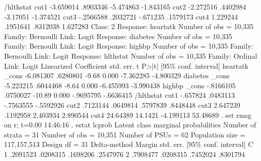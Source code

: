 /hlthstat    {\VBAR}
        cut1 {\VBAR}  -3.659014   .8903346                     -5.474863   -1.843165
        cut2 {\VBAR}  -2.272516   .4402984                      -3.17051   -1.374521
        cut3 {\VBAR}  -.2566588   .2032721                      -.671235    .1579173
        cut4 {\VBAR}   1.229244   .1951641                      .8312038    1.627283
{\smallskip}
Class:    2        
{\smallskip}
Response: heartatk                                      Number of obs = 10,335
Family:   Bernoulli
Link:     Logit    
{\smallskip}
Response: diabetes                                      Number of obs = 10,335
Family:   Bernoulli
Link:     Logit    
{\smallskip}
Response: highbp                                        Number of obs = 10,335
Family:   Bernoulli
Link:     Logit    
{\smallskip}
Response: hlthstat                                      Number of obs = 10,335
Family:   Ordinal  
Link:     Logit    
{\smallskip}
             {\VBAR}             Linearized
             {\VBAR} Coefficient  std. err.      t    P>|t|     [95\% conf. interval]
heartatk     {\VBAR}
       _cons {\VBAR}  -6.081307   .6280801    -9.68   0.000    -7.362285   -4.800329
diabetes     {\VBAR}
       _cons {\VBAR}  -5.223215   .6044468    -8.64   0.000    -6.455993   -3.990438
highbp       {\VBAR}
       _cons {\VBAR}  -.8166105   .0750027   -10.89   0.000    -.9695795   -.6636415
/hlthstat    {\VBAR}
        cut1 {\VBAR}   -.657824   .0483113                     -.7563555   -.5592926
        cut2 {\VBAR}   .7123144   .0649814                      .5797839    .8448448
        cut3 {\VBAR}   2.647239   .1192958                      2.403934    2.890544
        cut4 {\VBAR}   24.64389    14.1421                     -4.199113    53.48689
{\smallskip}
. set rmsg on     
r; t=0.00 14:46:16
{\smallskip}
. estat lcprob
{\smallskip}
Latent class marginal probabilities
{\smallskip}
Number of strata = 31                            Number of obs   =      10,351
Number of PSUs   = 62                            Population size = 117,157,513
                                                 Design df       =          31
{\smallskip}
             {\VBAR}            Delta-method
             {\VBAR}     Margin   std. err.     [95\% conf. interval]
           C {\VBAR}
          1  {\VBAR}   .2091523   .0208315      .1698206    .2547976
          2  {\VBAR}   .7908477   .0208315      .7452024    .8301794
